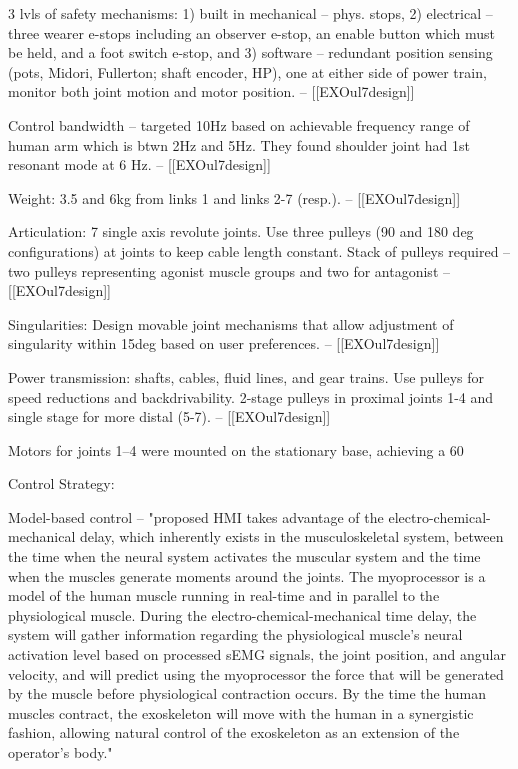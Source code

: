 3 lvls of safety mechanisms: 1) built in mechanical -- phys. stops, 2) electrical -- three wearer e-stops including an observer e-stop, an enable button which must be held, and a foot switch e-stop, and 3) software -- redundant position sensing (pots, Midori, Fullerton; shaft encoder, HP), one at either side of power train, monitor both joint motion and motor position. -- [[EXOul7design]]

Control bandwidth -- targeted 10Hz based on achievable frequency range of human arm which is btwn 2Hz and 5Hz.  They found shoulder joint had 1st resonant mode at 6 Hz. -- [[EXOul7design]]

Weight: 3.5 and 6kg from links 1 and links 2-7 (resp.). -- [[EXOul7design]]

Articulation: 7 single axis revolute joints.  Use three pulleys (90 and 180 deg configurations) at joints to keep cable length constant. Stack of pulleys required -- two pulleys representing agonist muscle groups and two for antagonist -- [[EXOul7design]]

Singularities: Design movable joint mechanisms that allow adjustment of singularity within 15deg based on user preferences. -- [[EXOul7design]]

Power transmission: shafts, cables, fluid lines, and gear trains.  Use pulleys for speed reductions and backdrivability.  2-stage pulleys in proximal joints 1-4 and single stage for more distal (5-7). -- [[EXOul7design]]

Motors for joints 1–4 were mounted on the stationary base, achieving a 60%


Control Strategy:

Model-based control -- "proposed HMI takes advantage of the electro-chemical-mechanical delay, which inherently exists in the musculoskeletal system, between the time when the neural system activates the muscular system and the time when the muscles generate moments around the joints. The myoprocessor is a model of the human muscle running in real-time and in parallel to the physiological muscle.   During the electro-chemical-mechanical time delay, the system will gather information regarding the physiological muscle’s neural activation level based on processed sEMG signals, the joint position, and angular velocity, and will predict using the myoprocessor the force that will be generated by the muscle before physiological contraction occurs. By the time the human muscles contract, the exoskeleton will move with the human in a synergistic fashion, allowing natural control of the exoskeleton as an extension of the operator's body." %

